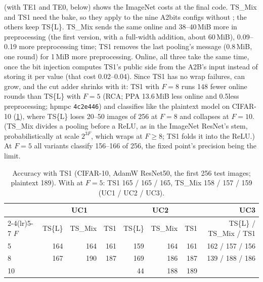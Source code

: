 (with TE1 and TE0, below) shows the ImageNet costs at the final code. TS\_Mix and TS1 need the
bake, so they apply to the nine A2bits configs without ; the others keep TS\{L\}. TS\_Mix sends the same
online and 38--40\,MiB more in preprocessing (the first version, with a full-width addition, about 60\,MiB), 0.09--0.19\s
more preprocessing time; TS1 removes the last pooling's message (0.8\,MiB, one round) for 1\,MiB more preprocessing. Online, all three take the same time, once the bit injection computes TS1's public side from
the A2B's input instead of storing it per value (that cost 0.02--0.04\s). Since TS1 has no wrap failures,
 can grow, and the cut adder shrinks with it: TS1 with $F = 8$ runs 148 fewer online rounds than
TS\{L\} with $F = 5$ (RCA; PPA 13.6\,MiB less online and 0.5\s less preprocessing; hpmpc \texttt{4c2e446}) and classifies like the plaintext
model on CIFAR-10 (\cref{tab:ts1acc}), where TS\{L\} loses 20--50 images of 256 at $F = 8$ and collapses at $F = 10$.
(TS\_Mix divides a pooling before a ReLU, as in the ImageNet ResNet's stem, probabilistically at scale $2^{3F}$, which
wraps at $F \ge 8$; TS1 folds it into the ReLU.) At $F = 5$ all variants classify 156--166 of 256, the fixed point's
precision being the limit.

\begin{table}[t]
\centering\small
\begin{tabular}{@{}lrrrrrrr@{}}
\toprule
& \multicolumn{3}{c}{UC1} & \multicolumn{3}{c}{UC2} & UC3\\
\cmidrule(lr){2-4}\cmidrule(lr){5-7}
$F$ & TS\{L\} & TS\_Mix & TS1 & TS\{L\} & TS\_Mix & TS1 & TS\{L\} / TS\_Mix / TS1\\
\midrule
5 & 164 & 164 & 161 & 159 & 164 & 161 & 162 / 157 / 156\\
8 & 167 & 190 & 187 & 169 & 186 & 187 & 139 / 188 / 186\\
10 & & & & 44 & 188 & 189 & \\
\bottomrule
\end{tabular}
\caption{Accuracy with TS1 (CIFAR-10, AdamW ResNet50, the first 256 test images; plaintext 189). With
 at $F = 5$: TS1 165 / 165 / 165, TS\_Mix 158 / 157 / 159 (UC1 / UC2 / UC3).}
\label{tab:ts1acc}
\end{table}

